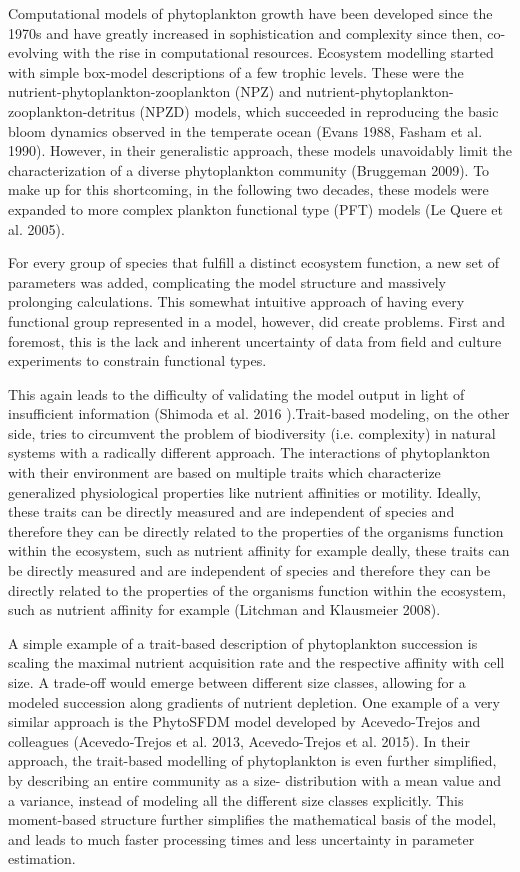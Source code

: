 Computational models of phytoplankton growth have been developed since the 1970s and have greatly increased in sophistication and complexity since then, co-evolving with the rise in computational resources. Ecosystem modelling started with simple box-model descriptions of a few trophic levels. These were the nutrient-phytoplankton-zooplankton (NPZ) and nutrient-phytoplankton-zooplankton-detritus (NPZD) models, which succeeded in reproducing the basic bloom dynamics observed in the temperate ocean (Evans 1988, Fasham et al. 1990). However, in their generalistic approach, these models unavoidably limit the characterization of a diverse phytoplankton community (Bruggeman 2009). To make up for this shortcoming, in the following two decades, these models were expanded to more complex plankton functional type (PFT) models (Le Quere et al. 2005). 

For every group of species that fulfill a distinct ecosystem function, a new set of parameters was added, complicating the model structure and massively prolonging calculations. This somewhat intuitive approach of having every functional group represented in a model, however, did create problems. First and foremost, this is the lack and inherent uncertainty of data from field and culture experiments to constrain functional types. 

This again leads to the difficulty of validating the model output in light of insufficient information (Shimoda et al. 2016 ).Trait-based modeling, on the other side, tries to circumvent the problem of biodiversity (i.e. complexity) in natural systems with a radically different approach. The interactions of phytoplankton with their environment are based on multiple traits which characterize generalized physiological properties like nutrient affinities or motility. Ideally, these traits can be directly measured and are independent of species and therefore they can be directly related to the properties of the organisms function within the ecosystem, such as nutrient affinity for example deally, these traits can be directly measured and are independent of species and therefore they can be directly related to the properties of the organisms function within the ecosystem, such as nutrient affinity for example (Litchman and Klausmeier 2008).  


A simple example of a trait-based description of phytoplankton succession is scaling the maximal nutrient acquisition rate and the respective affinity with cell size. A trade-off would emerge between different size classes, allowing for a modeled succession along gradients of nutrient depletion. One example of a very similar approach is the PhytoSFDM model developed by Acevedo-Trejos and colleagues (Acevedo‐Trejos et al. 2013, Acevedo-Trejos et al. 2015). In their approach, the trait-based modelling of phytoplankton is even further simplified, by describing an entire community as a size- distribution with a mean value and a variance, instead of modeling all the different size classes explicitly. This moment-based structure further simplifies the mathematical basis of the model, and leads to much faster processing times and less uncertainty in parameter estimation.



